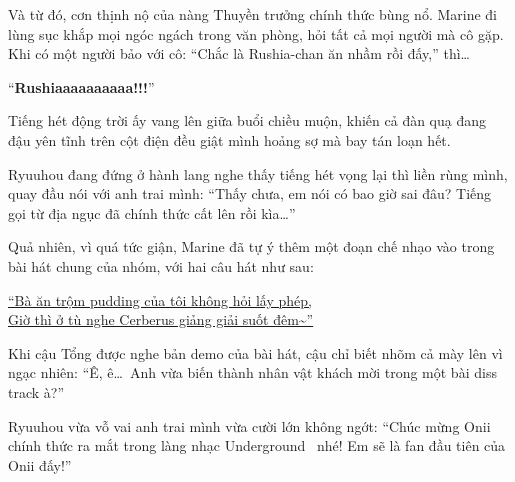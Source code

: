 \documentclass[../main.tex]{subfiles}
\begin{document}
Và từ đó, cơn thịnh nộ của nàng Thuyền trưởng chính thức bùng nổ. Marine đi lùng sục khắp mọi ngóc ngách trong văn phòng, hỏi tất cả mọi người mà cô gặp. Khi có một người bảo với cô: ``Chắc là Rushia-chan ăn nhầm rồi đấy,'' thì\dots

``{\Huge \textbf{Rushiaaaaaaaaaa!!!}}''

Tiếng hét động trời ấy vang lên giữa buổi chiều muộn, khiến cả đàn quạ đang đậu yên tĩnh trên cột điện đều giật mình hoảng sợ mà bay tán loạn hết.

Ryuuhou đang đứng ở hành lang nghe thấy tiếng hét vọng lại thì liền rùng mình, quay đầu nói với anh trai mình: ``Thấy chưa, em nói có bao giờ sai đâu? Tiếng gọi từ địa ngục đã chính thức cất lên rồi kìa\dots''

Quả nhiên, vì quá tức giận, Marine đã tự ý thêm một đoạn chế nhạo vào trong bài hát chung của nhóm, với hai câu hát như sau:

\begin{center}
  \uline{``Bà ăn trộm pudding của tôi không hỏi lấy phép,\\
    Giờ thì ở tù nghe Cerberus giảng giải suốt đêm\~{}''}
\end{center}

Khi cậu Tổng được nghe bản demo của bài hát, cậu chỉ biết nhõm cả mày lên vì ngạc nhiên: ``Ê, ê\dots\ Anh vừa biến thành nhân vật khách mời trong một bài diss track à?''

Ryuuhou vừa vỗ vai anh trai mình vừa cười lớn không ngớt: ``Chúc mừng Onii chính thức ra mắt trong làng nhạc Underground \hll\ nhé! Em sẽ là fan đầu tiên của Onii đấy!''
\end{document}
